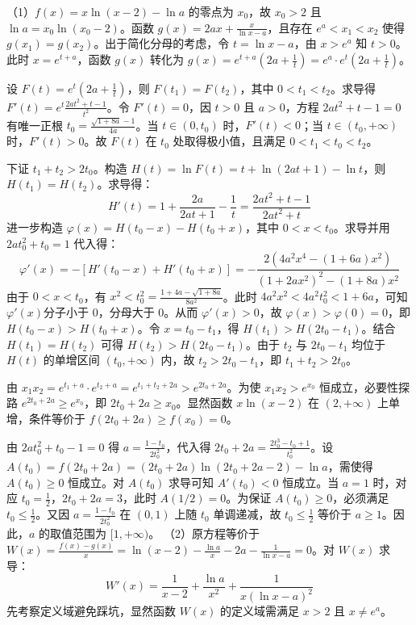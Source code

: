 \begin{solution}
（1）$f(x) = x\ln(x-2) - \ln a$ 的零点为 $x_0$，故 $x_0 > 2$ 且 $\ln a = x_0\ln(x_0-2)$。函数 $g(x) = 2ax + \frac{x}{\ln x - a}$，且存在 $e^a < x_1 < x_2$ 使得 $g(x_1) = g(x_2)$。出于简化分母的考虑，令 $t = \ln x - a$，由 $x > e^a$ 知 $t > 0$。此时 $x = e^{t+a}$，函数 $g(x)$ 转化为 $g(x) = e^{t+a} \left( 2a + \frac{1}{t} \right) = e^a \cdot e^t \left( 2a + \frac{1}{t} \right)$。

设 $F(t) = e^t \left( 2a + \frac{1}{t} \right)$，则 $F(t_1) = F(t_2)$，其中 $0 < t_1 < t_2$。求导得$F'(t) = e^t \frac{2at^2 + t - 1}{t^2}$。令 $F'(t) = 0$，因 $t>0$ 且 $a>0$，方程 $2at^2+t-1=0$ 有唯一正根 $t_0 = \frac{\sqrt{1+8a}-1}{4a}$。当 $t \in (0, t_0)$ 时，$F'(t) < 0$；当 $t \in (t_0, +\infty)$ 时，$F'(t) > 0$。故 $F(t)$ 在 $t_0$ 处取得极小值，且满足 $0 < t_1 < t_0 < t_2$。

下证 $t_1 + t_2 > 2t_0$。构造 $H(t) = \ln F(t) = t + \ln(2at+1) - \ln t$，则 $H(t_1) = H(t_2)$。求导得：
$$H'(t) = 1 + \frac{2a}{2at+1} - \frac{1}{t} = \frac{2at^2+t-1}{2at^2+t}$$
进一步构造 $\varphi(x) = H(t_0 - x) - H(t_0 + x)$，其中 $0 < x < t_0$。求导并用 $2at_0^2+t_0=1$ 代入得：
$$\varphi'(x) = - \left[ H'(t_0-x) + H'(t_0+x) \right] = -\frac{2(4a^2x^4 - (1+6a)x^2)}{(1+2ax^2)^2 - (1+8a)x^2}$$
由于 $0 < x < t_0$，有 $x^2 < t_0^2 = \frac{1+4a-\sqrt{1+8a}}{8a^2}$。此时 $4a^2x^2 < 4a^2t_0^2 < 1+6a$，可知$\varphi'(x)$分子小于 $0$，分母大于 $0$。从而 $\varphi'(x) > 0$，故 $\varphi(x) > \varphi(0) = 0$，即 $H(t_0 - x) > H(t_0 + x)$。令 $x = t_0 - t_1$，得 $H(t_1) > H(2t_0 - t_1)$。结合 $H(t_1) = H(t_2)$ 可得 $H(t_2) > H(2t_0 - t_1)$。由于 $t_2$ 与 $2t_0 - t_1$ 均位于 $H(t)$ 的单增区间 $(t_0, +\infty)$ 内，故 $t_2 > 2t_0 - t_1$，即 $t_1 + t_2 > 2t_0$。

由 $x_1 x_2 = e^{t_1+a} \cdot e^{t_2+a} = e^{t_1+t_2+2a}> e^{2t_0+2a}$。为使 $x_1 x_2 > e^{x_0}$ 恒成立，必要性探路 $e^{2t_0+2a} \geqslant e^{x_0}$，即 $2t_0 + 2a \geqslant x_0$。显然函数 $x \ln(x-2)$ 在 $(2, +\infty)$ 上单增，条件等价于 $f(2t_0+2a) \geqslant f(x_0) = 0$。

由 $2at_0^2+t_0-1=0$ 得 $a = \frac{1-t_0}{2t_0^2}$，代入得 $2t_0+2a = \frac{2t_0^3 - t_0 + 1}{t_0^2}$。设 $A(t_0) = f(2t_0+2a) = (2t_0+2a) \ln(2t_0+2a-2) - \ln a$，需使得 $A(t_0) \geqslant 0$ 恒成立。对 $A(t_0)$ 求导可知 $A'(t_0) < 0$ 恒成立。当 $a = 1$ 时，对应 $t_0 = \frac{1}{2}$，$2t_0+2a = 3$，此时 $A(1/2) = 0$。为保证 $A(t_0) \geqslant 0$，必须满足 $t_0 \le \frac{1}{2}$。又因 $a = \frac{1-t_0}{2t_0^2}$ 在 $(0, 1)$ 上随 $t_0$ 单调递减，故 $t_0 \le \frac{1}{2}$ 等价于 $a \geqslant 1$。因此，$a$ 的取值范围为 $[1, +\infty)$。
\newpage
（2）原方程等价于 $W(x) = \frac{f(x) - g(x)}{x} = \ln(x-2) - \frac{\ln a}{x} - 2a - \frac{1}{\ln x - a} = 0$。对 $W(x)$ 求导：
$$W'(x) = \frac{1}{x-2} + \frac{\ln a}{x^2} + \frac{1}{x(\ln x - a)^2}$$
先考察定义域避免踩坑，显然函数 $W(x)$ 的定义域需满足 $x > 2$ 且 $x \ne e^a$。


\end{solution}
